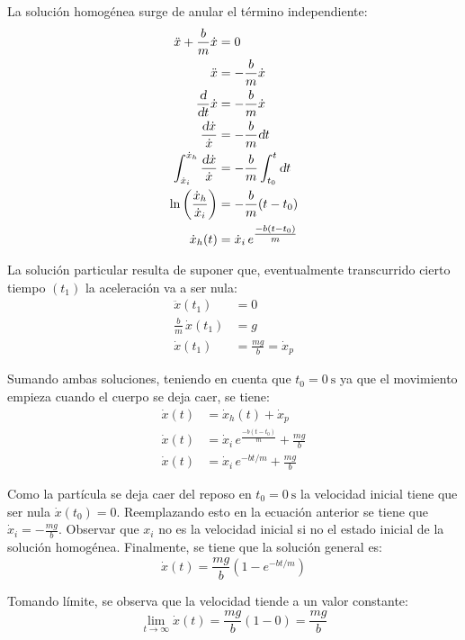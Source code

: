 \documentclass[a5paper,12pt,twoside]{book}
\begin{document}
La solución homogénea surge de anular el término independiente:
\begin{align*}
    \ddot{x} + \frac{b}{m} \dot{x} &= 0
    \\
    \ddot{x} &= - \frac{b}{m} \dot{x}
    \\
    \frac{\textsl{d}}{\textsl{d} t} \dot{x} &= - \frac{b}{m} \dot{x}
    \\
    \frac{\textsl{d} \dot{x}}{\dot{x}} &= - \frac{b}{m} \textsl{d} t
    \\
    \int_{\dot{x}_i}^{\dot{x}_h} \frac{\textsl{d} \dot{x}}{\dot{x}} &= - \frac{b}{m} \int_{t_0}^t \textsl{d} t
    \\
    \ln{ \left( \frac{\dot{x}_h}{\dot{x}_i} \right) } &= - \frac{b}{m} (t-t_0)
    \\
    \dot{x}_h(t) &= \dot{x}_i \, e^ {\tfrac{-b(t-t_0)}{m}}
\end{align*}

La solución particular resulta de suponer que, eventualmente transcurrido cierto tiempo $(t_1)$ la aceleración va a ser nula:
\begin{align*}
    \ddot{x}(t_1) &= 0
    \\
    \frac{b}{m} \, \dot{x}(t_1) &= g
    \\
    \dot{x}(t_1) &= \frac{mg}{b} = \dot{x}_p
\end{align*}

Sumando ambas soluciones, teniendo en cuenta que $t_0 = \SI{0}{\second}$ ya que el movimiento empieza cuando el cuerpo se deja caer, se tiene:
\begin{align*}
    \dot{x}(t) &= \dot{x}_h(t) + \dot{x}_p
    \\
    \dot{x}(t) &= \dot{x}_i \, e^ {\tfrac{-b(t-t_0)}{m}} + \frac{mg}{b}
    \\
    \dot{x}(t) &= \dot{x}_i \, e^ {-bt/m} + \frac{mg}{b}
\end{align*}

Como la partícula se deja caer del reposo en $t_0 = \SI{0}{\second}$ la velocidad inicial tiene que ser nula $\dot{x}(t_0) = 0$. Reemplazando esto en la ecuación anterior se tiene que $\dot{x}_i = -\frac{mg}{b}$. Observar que $x_i$ no es la velocidad inicial si no el estado inicial de la solución homogénea. Finalmente, se tiene que la solución general es:
\[ \dot{x}(t) = \frac{mg}{b} \left( 1-e^{-bt/m} \right) \]

Tomando límite, se observa que la velocidad tiende a un valor constante:
\[ \lim_{t \to \infty} \dot{x}(t) = \frac{mg}{b} (1-0) = \frac{mg}{b} \]
\end{document}
